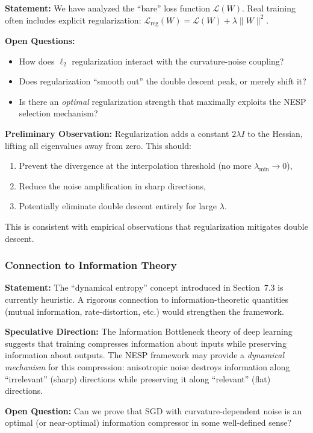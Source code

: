 \documentclass[
  journal=largetwo,
  year=2025,
  volume=37,
]{cup-journal}
\begin{document}
\textbf{Statement:} We have analyzed the ``bare'' loss function $\mathcal{L}(W)$. Real training often includes explicit regularization: $\mathcal{L}_{\text{reg}}(W) = \mathcal{L}(W) + \lambda \|W\|^2$.

\textbf{Open Questions:}
\begin{itemize}
    \item How does $\ell_2$ regularization interact with the curvature-noise coupling?
    \item Does regularization ``smooth out'' the double descent peak, or merely shift it?
    \item Is there an \textit{optimal} regularization strength that maximally exploits the NESP selection mechanism?
\end{itemize}

\textbf{Preliminary Observation:} Regularization adds a constant $2\lambda I$ to the Hessian, lifting all eigenvalues away from zero. This should:
\begin{enumerate}
    \item Prevent the divergence at the interpolation threshold (no more $\lambda_{\min} \to 0$),
    \item Reduce the noise amplification in sharp directions,
    \item Potentially eliminate double descent entirely for large $\lambda$.
\end{enumerate}
This is consistent with empirical observations that regularization mitigates double descent.

\subsubsection{Connection to Information Theory}

\textbf{Statement:} The ``dynamical entropy'' concept introduced in Section~7.3 is currently heuristic. A rigorous connection to information-theoretic quantities (mutual information, rate-distortion, etc.) would strengthen the framework.

\textbf{Speculative Direction:} The Information Bottleneck theory of deep learning suggests that training compresses information about inputs while preserving information about outputs. The NESP framework may provide a \textit{dynamical mechanism} for this compression: anisotropic noise destroys information along ``irrelevant'' (sharp) directions while preserving it along ``relevant'' (flat) directions.

\textbf{Open Question:} Can we prove that SGD with curvature-dependent noise is an optimal (or near-optimal) information compressor in some well-defined sense?
\end{document}
